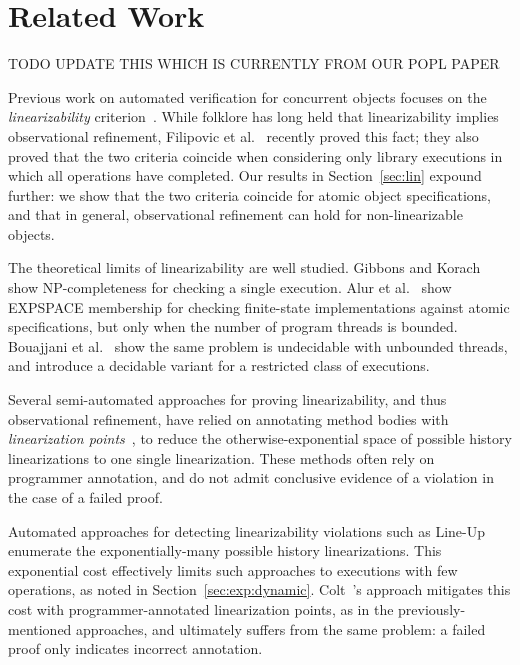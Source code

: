 \section{Related Work}
\label{sec:related}

TODO UPDATE THIS WHICH IS CURRENTLY FROM OUR POPL PAPER

Previous work on automated verification for concurrent objects focuses on the
\emph{linearizability} criterion~\citep{journals/toplas/HerlihyW90}. While
folklore has long held that linearizability implies observational refinement,
Filipovic et al.~\cite{journals/tcs/FilipovicORY10} recently proved this fact;
they also proved that the two criteria coincide when considering only library
executions in which all operations have completed. Our results in
Section~\ref{sec:lin} expound further: we show that the two criteria coincide
for atomic object specifications, and that in general, observational refinement
can hold for non-linearizable objects.

The theoretical limits of linearizability are well studied. Gibbons
and Korach~\cite{journals/siamcomp/GibbonsK97} show NP-completeness for
checking a single execution. Alur et al.~\cite{journals/iandc/AlurMP00} show
EXPSPACE membership for checking finite-state implementations against atomic
specifications, but only when the number of program threads is bounded.
Bouajjani et al.~\cite{conf/esop/BouajjaniEEH13} show the same problem is
undecidable with unbounded threads, and introduce a decidable variant for a
restricted class of executions.


Several semi-automated approaches for proving linearizability, and thus
observational refinement, have relied on annotating method bodies with
\emph{linearization points}~\cite{conf/cav/AmitRRSY07, conf/fm/LiuCLS09,
conf/podc/OHearnRVYY10, conf/cav/Vafeiadis10, conf/icse/Zhang11a}, to reduce the otherwise-exponential
space of possible history linearizations to one single linearization. These
methods often rely on programmer annotation, and do not admit conclusive
evidence of a violation in the case of a failed proof.

Automated approaches for detecting linearizability violations such as
Line-Up~\cite{conf/pldi/BurckhardtDMT10,DBLP:conf/asplos/BurnimNS11,DBLP:conf/kbse/ZhangCW13,DBLP:journals/jpdc/WingG93} enumerate the exponentially-many
possible history linearizations. This exponential cost effectively limits such
approaches to executions with few operations, as noted in
Section~\ref{sec:exp:dynamic}. Colt~\cite{conf/oopsla/ShachamBASVY11}'s
approach mitigates this cost with programmer-annotated linearization points, as
in the previously-mentioned approaches, and ultimately suffers from the same
problem: a failed proof only indicates incorrect annotation.

